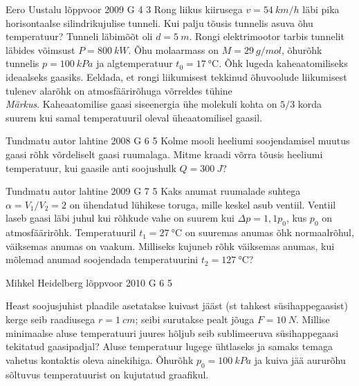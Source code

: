 \documentclass[11pt, twoside]{article}
\begin{document}
{%
{Eero Uustalu} %
{lõppvoor} %
{2009} %
{G 4} %
{3} %
{
\ifStatement
Rong liikus kiirusega $v=\SI{54}{km/h}$ läbi pika horisontaalse silindrikujulise tunneli.
Kui palju tõusis tunnelis asuva õhu temperatuur? Tunneli läbimõõt oli $d=\SI{5}{m}$.
Rongi elektrimootor tarbis tunnelit läbides võimsust $P=\SI{800}{kW}$.
Õhu molaarmass on $M=\SI{29}{g/mol}$, õhurõhk tunnelis $p=\SI{100}{kPa}$ ja algtemperatuur $t_0=\SI{17}{\celsius}$.
Õhk lugeda kaheaatomiliseks ideaalseks gaasiks. Eeldada, et rongi liikumisest tekkinud õhuvoolude liikumisest tulenev alarõhk on atmosfäärirõhuga võrreldes tühine\\
\emph{Märkus}. Kaheaatomilise gaasi siseenergia ühe molekuli kohta on $5/3$ korda suurem kui samal temperatuuril oleval üheaatomilisel gaasil.
\fi
}

{Tundmatu autor} %
{lahtine} %
{2008} %
{G 6} %
{5} %
{
\ifStatement
Kolme mooli heeliumi soojendamisel muutus gaasi rõhk võrdeliselt gaasi ruumalaga. Mitme kraadi võrra tõusis heeliumi temperatuur, kui gaasile anti soojushulk $Q = \SI{300}{J}$?
\fi
}

{Tundmatu autor} %
{lahtine} %
{2009} %
{G 7} %
{5} %
{
\ifStatement
Kaks anumat ruumalade suhtega $\alpha = V_1/V_2 = 2$ on ühendatud lühikese toruga, mille keskel asub ventiil. Ventiil laseb gaasi läbi juhul kui rõhkude vahe on suurem kui $\Delta p = 1,1p_0$, kus $p_0$ on atmosfäärirõhk. Temperatuuril $t_1 = \SI{27}{\celsius}$ on suuremas anumas õhk normaalrõhul, väiksemas anumas on vaakum. Milliseks kujuneb rõhk väiksemas anumas, kui mõlemad anumad soojendada temperatuurini $t_2 = \SI{127}{\celsius}$?
\fi
}

{Mihkel Heidelberg} %
{lõppvoor} %
{2010} %
{G 6} %
{5} %
{
\ifStatement
Heast soojusjuhist plaadile asetatakse kuivast jääst (st tahkest
süsihappegaasist) kerge seib raadiusega $r=\SI{1}{cm}$; seibi surutakse
pealt jõuga $F=\SI{10}{N}$. Millise minimaalse aluse
temperatuuri juures hõljub seib sublimeeruva süsihappegaasi tekitatud
gaasipadjal? Aluse temperatuur lugege ühtlaseks ja samaks temaga
vahetus kontaktis oleva ainekihiga. Õhurõhk $p_{0}=\SI{100}{kPa}$
ja kuiva jää aururõhu sõltuvus temperatuurist on kujutatud graafikul.

}}
\end{document}
